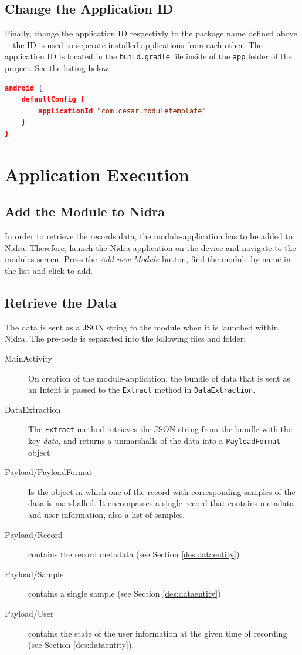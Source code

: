 \subsection{Change the Application ID}
Finally, change the application ID respectivly to the package name defined above---the ID is used to seperate installed applications from each other. The application ID is located in the \verb|build.gradle| file inside of the \verb|app| folder of the project. See the listing below.

\begin{lstlisting}[language=json, caption={}, captionpos=b]
android {
    defaultConfig {
        applicationId "com.cesar.moduletemplate"
    }
}
\end{lstlisting}

\section{Application Execution}


\subsection{Add the Module to Nidra}
In order to retrieve the records data, the module-application has to be added to Nidra. Therefore, launch the Nidra application on the device and navigate to the modules screen. Press the \textit{Add new Module} button, find the module by name in the list and click to add. 

\subsection{Retrieve the Data}
The data is sent as a JSON string to the module when it is launched within Nidra. The pre-code is separated into the following files and folder:

\begin{description}
    \item[MainActivity] On creation of the module-application, the bundle of data that is sent as an Intent is passed to the \verb|Extract| method in \verb|DataExtraction|.
    \item[DataExtraction] The \verb|Extract| method retrieves the JSON string from the bundle with the key \textit{data}, and returns a unmarshalls of the data into a \verb|PayloadFormat| object
    \item[Payload/PayloadFormat] Is the object in which one of the record with corresponding samples of the data is marshalled. It encompasses a single record that contains metadata and user information, also a list of samples. 
    \item[Payload/Record] contains the record metadata (see Section \ref{des:dataentity})
    \item[Payload/Sample] contains a single sample (see Section \ref{des:dataentity})
    \item[Payload/User] contains the state of the user information at the given time of recording (see Section \ref{des:dataentity}).
\end{description}

